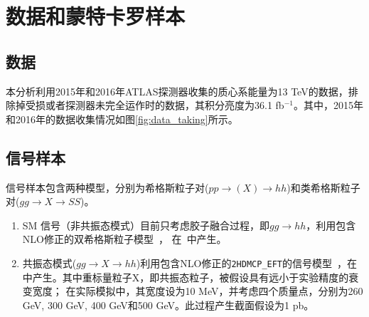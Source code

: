 \section{数据和蒙特卡罗样本}\label{chap:dataMC}

\subsection{数据}
本分析利用2015年和2016年ATLAS探测器收集的质心系能量为13 TeV的数据，排除掉受损或者探测器未完全运作时的数据，其积分亮度为36.1 fb$^{-1}$。其中，2015年和2016年的数据收集情况如图\ref{fig:data_taking}所示。


\subsection{信号样本}
信号样本包含两种模型，分别为希格斯粒子对($pp\rightarrow (X) \rightarrow hh$)和类希格斯粒子对($gg \rightarrow X \rightarrow SS$)\cite{ExoticHiggsTheory}。
\begin{enumerate}
    \item SM 信号（非共振态模式）目前只考虑胶子融合过程，即$gg\rightarrow hh$，利用包含NLO修正的双希格斯粒子模型~\cite{Frederix:2014hta}，
    在\MGMCatNLO~\cite{madgraph5amcnlo,syscalc}中产生。
    \item 共振态模式($gg\rightarrow X\rightarrow  hh$)利用包含NLO修正的\texttt{2HDMCP\_EFT}的信号模型~\cite{MG5-HH-LO}，在\MGMCatNLO 中产生。其中重标量粒子X，即共振态粒子，被假设具有远小于实验精度的衰变宽度；
在实际模拟中，其宽度设为10 MeV，并考虑四个质量点，分别为260 GeV, 300 GeV, 400 GeV和500 GeV。此过程产生截面假设为1 pb。 
\end{enumerate}


